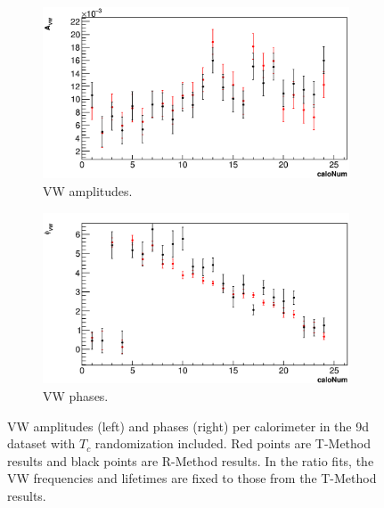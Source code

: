\documentclass[12pt,letterpaper]{article}
\begin{document}
\begin{figure}[]
\centering
    \begin{subfigure}[]{0.46\textwidth}
        \centering
        \includegraphics[width=\textwidth]{9d-CaloFits-VW-Amps}
        \caption{VW amplitudes.}
    \end{subfigure}%
    \hspace{1cm}
    \begin{subfigure}[]{0.46\textwidth}
        \centering
        \includegraphics[width=\textwidth]{9d-CaloFits-VW-Phases}
        \caption{VW phases.}
    \end{subfigure}
\caption[]{VW amplitudes (left) and phases (right) per calorimeter in the 9d dataset with $T_{c}$ randomization included. Red points are T-Method results and black points are R-Method results. In the ratio fits, the VW frequencies and lifetimes are fixed to those from the T-Method results.}
\label{fig:9d-PerCalo-VW}
\end{figure}
\end{document}
